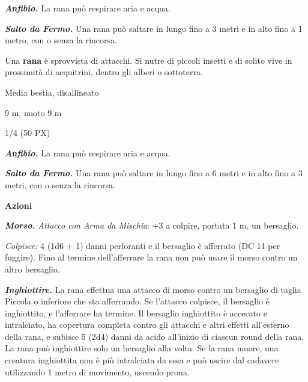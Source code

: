\begin{multicols}{2}
{\emph{\textbf{Anfibio.}} La rana può respirare aria e acqua.

\emph{\textbf{Salto da Fermo.}} Una rana può saltare in lungo fino a 3 metri e in alto fino a 1 metro, con o senza la rincorsa.

Una \textbf{rana} è sprovvista di attacchi. Si nutre di piccoli insetti e di solito vive in prossimità di acquitrini, dentro gli alberi o sottoterra.

\begin{description}[noitemsep, topsep=0pt, parsep=0pt, partopsep=0pt, itemsep=1pt, leftmargin=2.35cm,  labelwidth=2.2cm, itemindent=0cm, listparindent=0pt] %
\setlength{\baselineskip}{10pt}
\item[\textbf{Taglia/Tipo}] Media bestia, disallineato
\item[\textbf{Caratt.}] 
\item[\textbf{Punti Ferita}] 
\item[\textbf{Tiri Salvez.}] 
\item[\textbf{Movimento}] 9 m, nuoto 9 m
\item[\textbf{Sfida}] 1/4 (50 PX)
\end{description}
\smallskip

\emph{\textbf{Anfibio.}} La rana può respirare aria e acqua.

\emph{\textbf{Salto da Fermo.}} Una rana può saltare in lungo fino a 6 metri e in alto fino a 3 metri, con o senza la rincorsa.

\textbf{Azioni}

\emph{\textbf{Morso.} Attacco con Arma da Mischia}: +3 a colpire, portata 1 m, un bersaglio.

\emph{Colpisce:} 4 (1d6 + 1) danni perforanti e il bersaglio è afferrato (DC 11 per fuggire). Fino al termine dell'afferrare la rana non può usare il morso contro un altro bersaglio.

\emph{\textbf{Inghiottire.}} La rana effettua una attacco di morso contro un bersaglio di taglia Piccola o inferiore che sta afferrando. Se l'attacco colpisce, il bersaglio è inghiottito, e l'afferrare ha termine. Il bersaglio inghiottito è accecato e intralciato, ha copertura completa contro gli attacchi e altri effetti all'esterno della rana, e subisce 5 (2d4) danni da acido all'inizio di ciascun round della rana. La rana può inghiottire solo un bersaglio alla volta. Se la rana muore, una creatura inghiottita non è più intralciata da essa e può uscire dal cadavere utilizzando 1 metro di movimento, uscendo prona.

}
\end{multicols}
